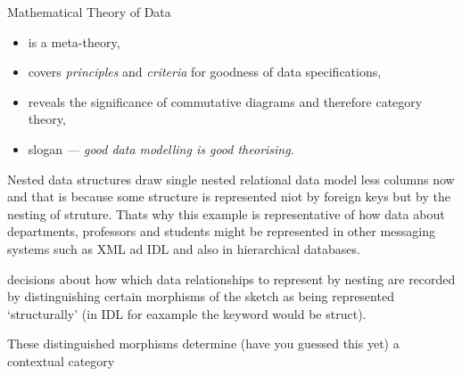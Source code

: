 \begin{frame}{Mathematical Theory of Data}
\begin{itemize}
\item is a meta-theory,
\item covers \textit{principles} and \textit{criteria} for goodness of data specifications,
\item reveals the significance of commutative diagrams and therefore category theory,
\item slogan \textit{--- good data modelling is good theorising}. 
\end{itemize}
\end{frame}







\iffalse
\subsection{Example}
\begin{frame}{Example -- LCMSMS Data}
\scalebox{0.2}{

}
\pause
\vspace{-5cm}
\begin{block}{}
This diagram has representations of
\begin{itemize}
  \item a terminal object,
  \item 35 structurally implemented relationships, 
  \item 22 reference relationships implemented by foreign key,
  \item 5 coproducts,
  \item approx 15 commutative diagrams,
  \item xxx pullback diagrams.
\end{itemize}
Generated into code in XML, ECMA Javascript, Python.
\end{block}
\end{frame}
\fi

\begin{frame}{Nested data structures}
draw single nested relational data model
less columns now and that is because some structure is represented niot by foreign keys but by the nesting of struture. Thats why this example is representative of how data about departments, professors and students might be represented in other messaging systems such as XML ad IDL and also in hierarchical databases. 

decisions about how which data relationships to represent by nesting are recorded by distinguishing certain morphisms of the sketch as being represented `structurally'
(in IDL for eaxample the keyword would be struct).

These distinguished morphisms determine (have you guessed this yet) a contextual category 
\end{frame}


